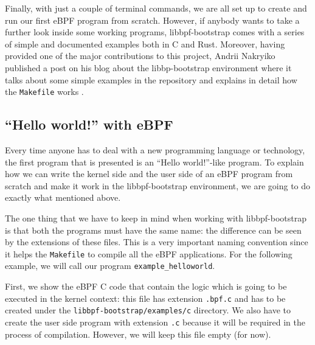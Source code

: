 Finally, with just a couple of terminal commands, we are all set up to create and run our first eBPF program from scratch.
However, if anybody wants to take a further look inside some working programs, libbpf-bootstrap comes with a series of simple and documented examples both in C and Rust.
Moreover, having provided one of the major contributions to this project, Andrii Nakryiko published a post on his blog about the libbp-bootstrap environment where it talks about some simple examples in the repository and explains in detail how the \colorbox{backcolour}{\lstinline[style=commandline, language=bash, breaklines=true]|Makefile|} works \cite{ANlibbpfbootstrap}.

\subsection{``Hello world!'' with eBPF}

Every time anyone has to deal with a new programming language or technology, the first program that is presented is an ``Hello world!''-like program.
To explain how we can write the kernel side and the user side of an eBPF program from scratch and make it work in the libbpf-bootstrap environment, we are going to do exactly what mentioned above.

The one thing that we have to keep in mind when working with libbpf-bootstrap is that both the programs must have the same name: the difference can be seen by the extensions of these files.
This is a very important naming convention since it helps the \colorbox{backcolour}{\lstinline[style=commandline, language=bash, breaklines=true]|Makefile|} to compile all the eBPF applications.
For the following example, we will call our program \colorbox{backcolour}{\lstinline[style=commandline, language=bash, breaklines=true]|example_helloworld|}.

First, we show the eBPF C code that contain the logic which is going to be executed in the kernel context: this file has extension \colorbox{backcolour}{\lstinline[style=commandline, language=bash, breaklines=true]|.bpf.c|} and has to be created under the \colorbox{backcolour}{\lstinline[style=commandline, language=bash, breaklines=true]|libbpf-bootstrap/examples/c|} directory.
We also have to create the user side program with extension \colorbox{backcolour}{\lstinline[style=commandline, language=bash, breaklines=true]|.c|} because it will be required in the process of compilation.
However, we will keep this file empty (for now).


